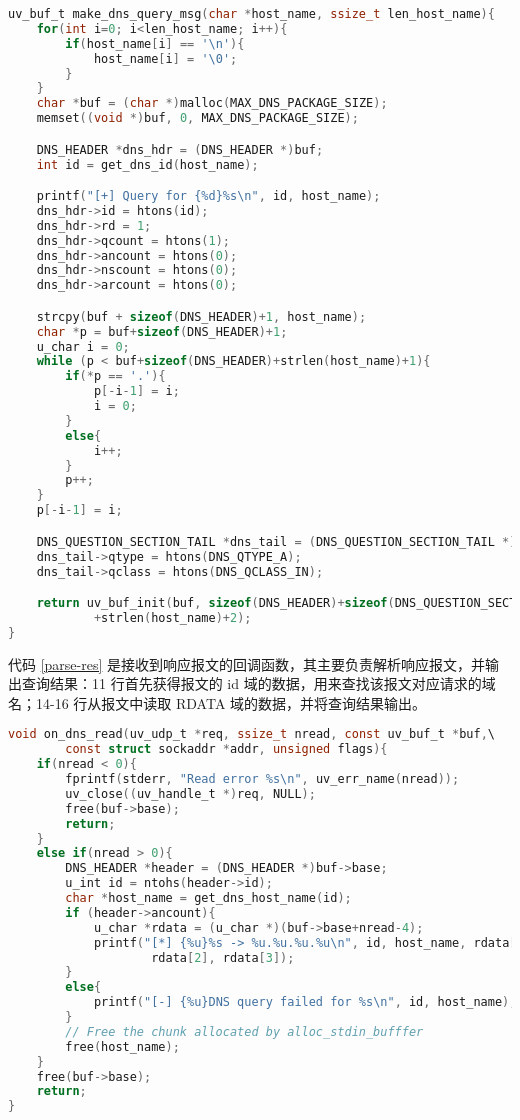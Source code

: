 \documentclass[a4paper,11pt,UTF8,AutoFakeBold= {2.88}]{ctexart}
\begin{document}
\begin{lstlisting}[label={make-req}, caption={构造请求报文}, captionpos=b, language=c]
uv_buf_t make_dns_query_msg(char *host_name, ssize_t len_host_name){
    for(int i=0; i<len_host_name; i++){
        if(host_name[i] == '\n'){
            host_name[i] = '\0';
        }
    }
    char *buf = (char *)malloc(MAX_DNS_PACKAGE_SIZE);
    memset((void *)buf, 0, MAX_DNS_PACKAGE_SIZE);

    DNS_HEADER *dns_hdr = (DNS_HEADER *)buf;
    int id = get_dns_id(host_name);

    printf("[+] Query for {%d}%s\n", id, host_name);
    dns_hdr->id = htons(id);
    dns_hdr->rd = 1;
    dns_hdr->qcount = htons(1);
    dns_hdr->ancount = htons(0);
    dns_hdr->nscount = htons(0);
    dns_hdr->arcount = htons(0);

    strcpy(buf + sizeof(DNS_HEADER)+1, host_name);
    char *p = buf+sizeof(DNS_HEADER)+1;
    u_char i = 0;
    while (p < buf+sizeof(DNS_HEADER)+strlen(host_name)+1){
        if(*p == '.'){
            p[-i-1] = i;
            i = 0;
        }
        else{
            i++;
        }
        p++;
    }
    p[-i-1] = i;

    DNS_QUESTION_SECTION_TAIL *dns_tail = (DNS_QUESTION_SECTION_TAIL *)(p+1);
    dns_tail->qtype = htons(DNS_QTYPE_A);
    dns_tail->qclass = htons(DNS_QCLASS_IN);

    return uv_buf_init(buf, sizeof(DNS_HEADER)+sizeof(DNS_QUESTION_SECTION_TAIL)\
            +strlen(host_name)+2);
}
\end{lstlisting}

代码 \ref{parse-res} 是接收到响应报文的回调函数，其主要负责解析响应报文，并输出查询结果：11 行首先获得报文的 id 域的数据，用来查找该报文对应请求的域名；14-16 行从报文中读取 RDATA 域的数据，并将查询结果输出。

\begin{lstlisting}[label={parse-res},caption={解析响应报文},captionpos=b,language=c]
void on_dns_read(uv_udp_t *req, ssize_t nread, const uv_buf_t *buf,\
        const struct sockaddr *addr, unsigned flags){
    if(nread < 0){
        fprintf(stderr, "Read error %s\n", uv_err_name(nread));
        uv_close((uv_handle_t *)req, NULL);
        free(buf->base);
        return;
    }
    else if(nread > 0){
        DNS_HEADER *header = (DNS_HEADER *)buf->base;
        u_int id = ntohs(header->id);
        char *host_name = get_dns_host_name(id);
        if (header->ancount){
            u_char *rdata = (u_char *)(buf->base+nread-4);
            printf("[*] {%u}%s -> %u.%u.%u.%u\n", id, host_name, rdata[0], rdata[1],\
                    rdata[2], rdata[3]);
        }
        else{
            printf("[-] {%u}DNS query failed for %s\n", id, host_name);
        }
        // Free the chunk allocated by alloc_stdin_bufffer
        free(host_name);
    }
    free(buf->base);
    return;
}
\end{lstlisting}
\end{document}
